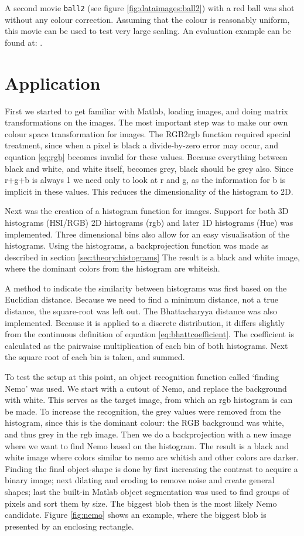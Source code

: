 \documentclass[a4paper,11pt]{article}
\begin{document}
A second movie \texttt{ball2} (see figure \ref{fig:dataimages:ball2}) with a red ball was shot without any colour correction.
Assuming that the colour is reasonably uniform, this movie can be used to test  very large scaling. An evaluation example can be found at: .



\section{Application}
\label{sec:application}
First we started to get familiar with Matlab, loading images, and doing matrix transformations on the images.
The most important step was to make our own colour space transformation for images.
The RGB2rgb function required special treatment, since when a pixel is black a divide-by-zero error may occur, and equation \ref{eq:rgb} becomes invalid for these values.
Because everything between black and white, and white itself, becomes grey, black should be grey also.
Since r+g+b is always 1 we need only to look at r and g, as the information for b is implicit in these values.
This reduces the dimensionality of the histogram to 2D.

Next was the creation of a histogram function for images.
Support for both 3D histograms (HSI/RGB) 2D histograms (rgb) and later 1D histograms (Hue) was implemented.
Three dimensional bins also allow for an easy visualisation of the histograms.
Using the histograms, a backprojection function was made as described in section \ref{sec:theory:histograms}
The result is a black and white image, where the dominant colors from the histogram are whiteish.

A method to indicate the similarity between histograms was first based on the Euclidian distance. Because we need to find a minimum distance, not a true distance, the square-root was left out.
The Bhattacharyya distance was also implemented.
Because it is applied to a discrete distribution, it differs slightly from the continuous definition of equation \ref{eq:bhattcoefficient}.
The coefficient is calculated as the pairwaise multiplication of each bin of both histograms.
Next the square root of each bin is taken, and summed.

To test the setup at this point, an object recognition function called `finding Nemo' was used.
We start with a cutout of Nemo, and replace the background with white.
This serves as the target image, from which an rgb histogram is can be made.
To increase the recognition, the grey values were removed from the histogram, since this is the dominant colour: the RGB background was white, and thus grey in the rgb image.
Then we do a backprojection with a new image where we want to find Nemo based on the histogram.
The result is a black and white image where colors similar to nemo are whitish and other colors are darker.
Finding the final object-shape is done by first increasing the contrast to acquire a binary image; next dilating and eroding to remove noise and create general shapes; last the built-in Matlab object segmentation was used to find groups of pixels and sort them by size.
The biggest blob then is the most likely Nemo candidate.
Figure \ref{fig:nemo} shows an example, where the biggest blob is presented by an enclosing rectangle.
\end{document}
